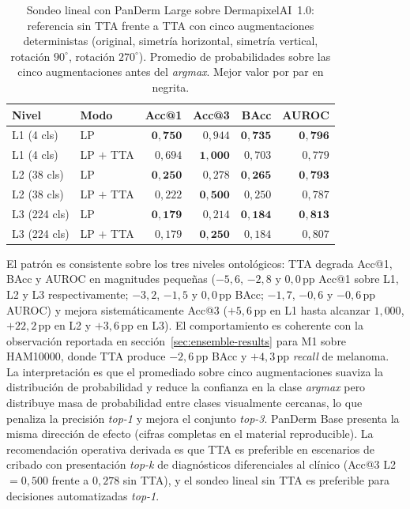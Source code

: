 \begin{table}[H]
\centering
\footnotesize
\setlength{\tabcolsep}{4pt}
\renewcommand{\arraystretch}{0.95}
\caption{Sondeo lineal con PanDerm Large sobre DermapixelAI~1.0:
referencia sin TTA frente a TTA con cinco augmentaciones
deterministas (original, simetría horizontal, simetría vertical,
rotación $90^\circ$, rotación $270^\circ$). Promedio de
probabilidades sobre las cinco augmentaciones antes del
\emph{argmax}. Mejor valor por par en negrita.}
\label{tab:dermapixel-tta}
\begin{tabular}{llrrrr}
\hline
Nivel & Modo & Acc@1 & Acc@3 & BAcc & AUROC \\
\hline
L1 (4 cls)   & LP                & $\mathbf{0{,}750}$ & $0{,}944$          & $\mathbf{0{,}735}$ & $\mathbf{0{,}796}$ \\
L1 (4 cls)   & LP $+$ TTA        & $0{,}694$          & $\mathbf{1{,}000}$ & $0{,}703$          & $0{,}779$ \\
L2 (38 cls)  & LP                & $\mathbf{0{,}250}$ & $0{,}278$          & $\mathbf{0{,}265}$ & $\mathbf{0{,}793}$ \\
L2 (38 cls)  & LP $+$ TTA        & $0{,}222$          & $\mathbf{0{,}500}$ & $0{,}250$          & $0{,}787$ \\
L3 (224 cls) & LP                & $\mathbf{0{,}179}$ & $0{,}214$          & $\mathbf{0{,}184}$ & $\mathbf{0{,}813}$ \\
L3 (224 cls) & LP $+$ TTA        & $0{,}179$          & $\mathbf{0{,}250}$ & $0{,}184$          & $0{,}807$ \\
\hline
\end{tabular}
\end{table}

El patrón es consistente sobre los tres niveles ontológicos: TTA
degrada Acc@1, BAcc y AUROC en magnitudes pequeñas ($-5{,}6$,
$-2{,}8$ y $0{,}0$\,pp Acc@1 sobre L1, L2 y L3 respectivamente;
$-3{,}2$, $-1{,}5$ y $0{,}0$\,pp BAcc; $-1{,}7$, $-0{,}6$ y
$-0{,}6$\,pp AUROC) y mejora sistemáticamente Acc@3
($+5{,}6$\,pp en L1 hasta alcanzar $1{,}000$, $+22{,}2$\,pp en
L2 y $+3{,}6$\,pp en L3). El comportamiento es coherente con la
observación reportada en sección~\ref{sec:ensemble-results} para
M1 sobre HAM10000, donde TTA produce $-2{,}6$\,pp BAcc y
$+4{,}3$\,pp \emph{recall} de melanoma. La interpretación es que el
promediado sobre cinco augmentaciones suaviza la distribución de
probabilidad y reduce la confianza en la clase \emph{argmax} pero
distribuye masa de probabilidad entre clases visualmente cercanas,
lo que penaliza la precisión \emph{top-1} y mejora el conjunto
\emph{top-3}. PanDerm Base presenta la misma dirección de efecto
(cifras completas en el material reproducible). La recomendación
operativa derivada es que TTA es preferible en escenarios de cribado
con presentación \emph{top-k} de diagnósticos diferenciales al
clínico (Acc@3 L2 $= 0{,}500$ frente a $0{,}278$ sin TTA), y el
sondeo lineal sin TTA es preferible para decisiones automatizadas
\emph{top-1}.


